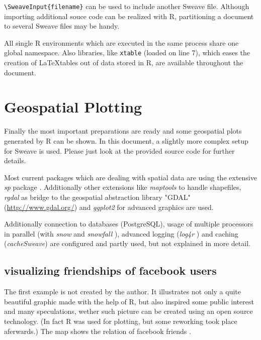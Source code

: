 \documentclass{ifacconf}
\begin{document}
\texttt{\textbackslash{}SweaveInput\{filename\}} can be used to include 
another Sweave file. Although importing additional souce code can be realized with
R, partitioning a document to several Sweave files may be handy.

All single R environments which are executed in the same process share one
global namespace. Also libraries, like \texttt{xtable} (loaded on line 7), which eases the
creation of \LaTeX tables out of data stored in R, are
available throughout the document.




\section{Geospatial Plotting}

Finally the most important preparations are ready and some geospatial plots 
generated by R can be shown. In this document, a slightly more complex
setup for Sweave is used. Please just look at the provided source code for
further details.

Most current packages which are dealing with spatial data are using the
extensive \textit{sp} package \citep{RSpatialDataAnalysis}. Additionally
other extensions like \textit{maptools} to handle shapefiles, \textit{rgdal}
as bridge to the geospatial abstraction library "GDAL" (\url{http://www.gdal.org/})
and \textit{ggplot2} \citep{Rggplot2} for advanced graphics are used.

Additionally connection to databases (PostgreSQL), usage of multiple processors 
in parallel (with \textit{snow} and \textit{snowfall} \citep{Rsnow, Rsnowfall}), 
advanced logging (\textit{log4r} \citep{Rlog4r}) and caching (\textit{cacheSweave}) 
are configured and partly used, but not explained in more detail.

\subsection{visualizing friendships of facebook users}
The first example is not created by the author. It illustrates not only a
quite beautiful graphic made with the help of R, but also inspired some
public interest and many speculations, wether such picture can be
created using an open source technology. (In fact R was used for plotting,
but some reworking took place aferwards.) The map shows the relation of 
facebook friends \citep{FacebookFriendMap}.
\end{document}
